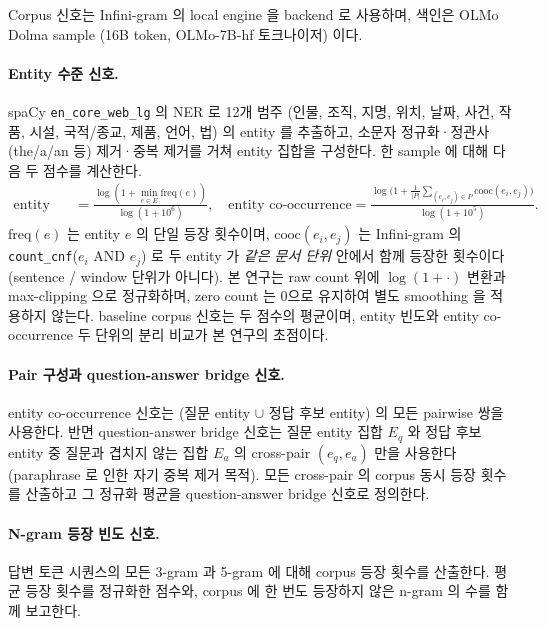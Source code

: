 Corpus 신호는 Infini-gram\cite{infinigram2024} 의 local engine 을 backend 로 사용하며, 색인은 OLMo Dolma sample (16B token, OLMo-7B-hf 토크나이저) 이다.

\paragraph{Entity 수준 신호.}
spaCy \texttt{en\_core\_web\_lg} 의 NER 로 12개 범주 (인물, 조직, 지명, 위치, 날짜, 사건, 작품, 시설, 국적/종교, 제품, 언어, 법) 의 entity 를 추출하고, 소문자 정규화·정관사 (the/a/an 등) 제거·중복 제거를 거쳐 entity 집합을 구성한다. 한 sample 에 대해 다음 두 점수를 계산한다.
\begin{align*}
\text{entity 빈도} &= \frac{\log(1 + \min_{e \in E} \mathrm{freq}(e))}{\log(1 + 10^6)}, \quad \text{entity co-occurrence} = \frac{\log\!\bigl(1 + \tfrac{1}{|P|}\sum_{(e_i,e_j) \in P}\mathrm{cooc}(e_i,e_j)\bigr)}{\log(1 + 10^5)}.
\end{align*}
$\mathrm{freq}(e)$ 는 entity $e$ 의 단일 등장 횟수이며, $\mathrm{cooc}(e_i,e_j)$ 는 Infini-gram 의 \texttt{count\_cnf}($e_i$ AND $e_j$) 로 두 entity 가 \emph{같은 문서 단위} 안에서 함께 등장한 횟수이다 (sentence / window 단위가 아니다). 본 연구는 raw count 위에 $\log(1+\cdot)$ 변환과 max-clipping 으로 정규화하며, zero count 는 0으로 유지하여 별도 smoothing 을 적용하지 않는다. baseline corpus 신호는 두 점수의 평균이며, entity 빈도와 entity co-occurrence 두 단위의 분리 비교가 본 연구의 초점이다.

\paragraph{Pair 구성과 question-answer bridge 신호.}
entity co-occurrence 신호는 (질문 entity $\cup$ 정답 후보 entity) 의 모든 pairwise 쌍을 사용한다. 반면 question-answer bridge 신호는 질문 entity 집합 $E_q$ 와 정답 후보 entity 중 질문과 겹치지 않는 집합 $E_a$ 의 cross-pair $(e_q, e_a)$ 만을 사용한다 (paraphrase 로 인한 자기 중복 제거 목적). 모든 cross-pair 의 corpus 동시 등장 횟수를 산출하고 그 정규화 평균을 question-answer bridge 신호로 정의한다.

\paragraph{N-gram 등장 빈도 신호.}
답변 토큰 시퀀스의 모든 3-gram 과 5-gram 에 대해 corpus 등장 횟수를 산출한다. 평균 등장 횟수를 정규화한 점수와, corpus 에 한 번도 등장하지 않은 n-gram 의 수를 함께 보고한다.

